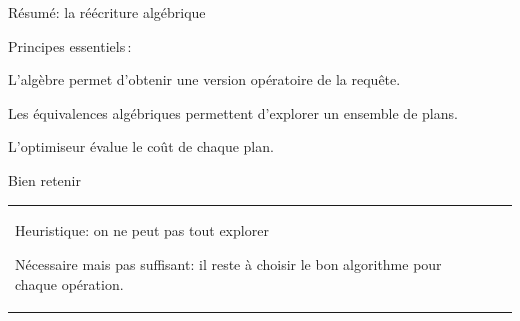 \begin{frame}{Résumé: la réécriture algébrique}

Principes essentiels\,:

\begin{redlist}
  \item L'algèbre permet d'obtenir une version opératoire de la requête.
      
   \item Les équivalences algébriques permettent d'explorer
    un ensemble de plans.
      
    \item L'optimiseur évalue le coût de chaque plan.

\end{redlist}

\vfill

Bien retenir

\begin{tabular}{p{9cm}p{5cm}}
\begin{redbullet}
  \item \alert{Heuristique}: on ne peut pas \alert{tout explorer}
  \item \alert{Nécessaire mais pas suffisant}: il reste à choisir 
   le bon algorithme pour chaque opération.
\end{redbullet}
&
~
\end{tabular}





\end{frame}
